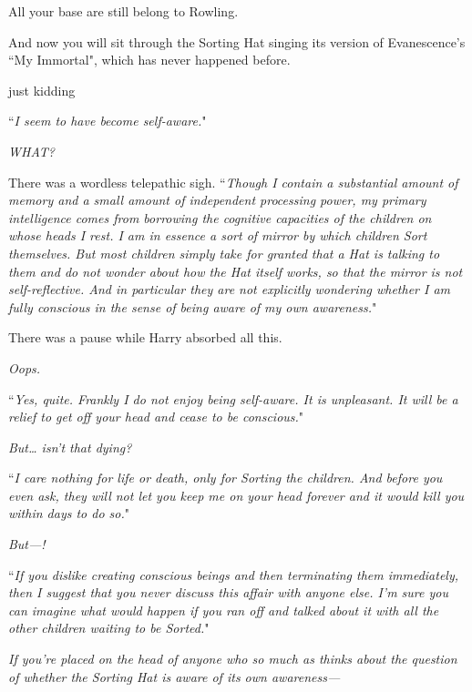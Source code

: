 
\begin{chapterOpeningAuthorNote}
All your base are still belong to Rowling.

And now you will sit through the Sorting Hat singing its version of Evanescence's ``My Immortal", which has never happened before.

just kidding
\end{chapterOpeningAuthorNote}


\hplettrineextrapara
``\emph{I seem to have become self-aware.}"

\emph{WHAT?}

There was a wordless telepathic sigh. ``\emph{Though I contain a substantial amount of memory and a small amount of independent processing power, my primary intelligence comes from borrowing the cognitive capacities of the children on whose heads I rest. I am in essence a sort of mirror by which children Sort \emph{themselves}. But most children simply take for granted that a Hat is talking to them and do not wonder about how the Hat \emph{itself} works, so that the mirror is not \emph{self}-reflective. And in \emph{particular} they are not explicitly wondering whether I am fully conscious in the sense of being aware of my own awareness.}"

There was a pause while Harry absorbed all this.

\emph{Oops.}

``\emph{Yes, quite. Frankly I do not enjoy being self-aware. It is unpleasant. It will be a relief to get off your head and cease to be conscious.}"

\emph{But{\ldots} isn't that dying?}

``\emph{I care nothing for life or death, only for Sorting the children. And before you even ask, they will not let you keep me on your head forever and it would kill you within days to do so.}"

\emph{But—!}

``\emph{If you dislike creating conscious beings and then terminating them immediately, then I suggest that you never discuss this affair with anyone else. I'm sure you can imagine what would happen if you ran off and talked about it with all the other children waiting to be Sorted.}"

\emph{If you're placed on the head of anyone who so much as \emph{thinks} about the question of whether the Sorting Hat is aware of its own awareness—}

